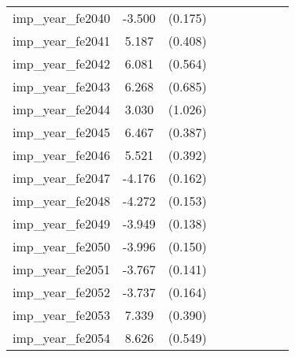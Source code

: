 {\begin{tabular}{l*{4}{cc}}
imp\_year\_fe2040&   -3.500\sym{***}&  (0.175)&                  &         &                  &         &                  &         \\
imp\_year\_fe2041&    5.187\sym{***}&  (0.408)&                  &         &                  &         &                  &         \\
imp\_year\_fe2042&    6.081\sym{***}&  (0.564)&                  &         &                  &         &                  &         \\
imp\_year\_fe2043&    6.268\sym{***}&  (0.685)&                  &         &                  &         &                  &         \\
imp\_year\_fe2044&    3.030\sym{**} &  (1.026)&                  &         &                  &         &                  &         \\
imp\_year\_fe2045&    6.467\sym{***}&  (0.387)&                  &         &                  &         &                  &         \\
imp\_year\_fe2046&    5.521\sym{***}&  (0.392)&                  &         &                  &         &                  &         \\
imp\_year\_fe2047&   -4.176\sym{***}&  (0.162)&                  &         &                  &         &                  &         \\
imp\_year\_fe2048&   -4.272\sym{***}&  (0.153)&                  &         &                  &         &                  &         \\
imp\_year\_fe2049&   -3.949\sym{***}&  (0.138)&                  &         &                  &         &                  &         \\
imp\_year\_fe2050&   -3.996\sym{***}&  (0.150)&                  &         &                  &         &                  &         \\
imp\_year\_fe2051&   -3.767\sym{***}&  (0.141)&                  &         &                  &         &                  &         \\
imp\_year\_fe2052&   -3.737\sym{***}&  (0.164)&                  &         &                  &         &                  &         \\
imp\_year\_fe2053&    7.339\sym{***}&  (0.390)&                  &         &                  &         &                  &         \\
imp\_year\_fe2054&    8.626\sym{***}&  (0.549)&                  &         &                  &         &                  &         \\

\end{tabular}}
